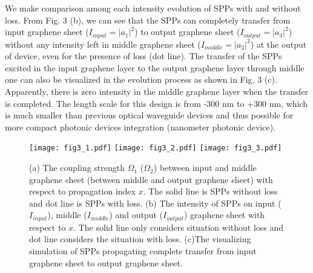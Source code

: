 \documentclass[preprint,12pt,numbers,sort&compress]{elsarticle}
\begin{document}
We make comparison among each intensity evolution of SPPs with and without loss. From Fig. 3 (b), we can see that the SPPs can completely transfer from input graphene sheet ($I_{input}=|a_1|^2$) to output graphene sheet ($I_{output}=|a_3|^2$) without any intensity left in middle graphene sheet ($I_{middle}=|a_2|^2$) at the output of device, even for the presence of loss (dot line).
The transfer of the SPPs excited in the input graphene layer to the output graphene layer through middle one can also be visualized in the evolution process as shown in Fig. 3 (c).
Apparently, there is zero intensity in the middle graphene layer when the transfer is completed.
The length scale for this design is from -300 nm to +300 nm, which is much smaller than previous optical waveguide devices \cite{Paspalakis06, Huang14, Hristova16, Longhi07} and thus possible for more compact photonic devices integration (nanometer photonic device).

\begin{figure}[hbtp]
\centering
\texttt{[image: fig3\_1.pdf]}
\texttt{[image: fig3\_2.pdf]}
\texttt{[image: fig3\_3.pdf]}
\caption{(a) The coupling strength $\Omega_1$ ($\Omega_2$) between input and middle graphene sheet (between middle and output graphene sheet) with respect to propagation index $x$. The solid line is SPPs without loss and dot line is SPPs with loss. (b) The intensity of SPPs on input ($I_{input}$), middle ($I_{middle}$) and output ($I_{output}$) graphene sheet with respect to $x$. The solid line only considers situation without loss and dot line considers the situation with loss. (c)The visualizing simulation of SPPs propagating complete transfer from input graphene sheet to output graphene sheet.}
\label{example}
\end{figure}
\end{document}
